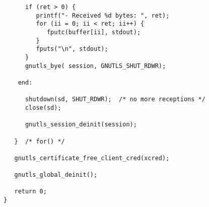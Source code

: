 \begin{verbatim}
      if (ret > 0) {
         printf("- Received %d bytes: ", ret);
         for (ii = 0; ii < ret; ii++) {
            fputc(buffer[ii], stdout);
         }
         fputs("\n", stdout);
      }
      gnutls_bye( session, GNUTLS_SHUT_RDWR);

    end:

      shutdown(sd, SHUT_RDWR);  /* no more receptions */
      close(sd);

      gnutls_session_deinit(session);

   }  /* for() */

   gnutls_certificate_free_client_cred(xcred);

   gnutls_global_deinit();

   return 0;
}

\end{verbatim}
